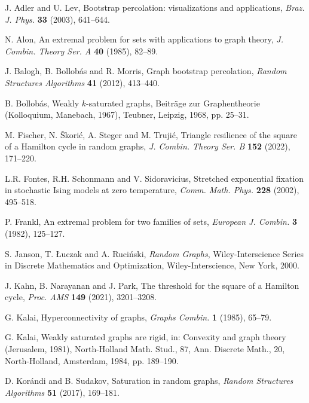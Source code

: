 \documentclass[hidelinks, 11pt]{article}
\theoremstyle{plain}
\theoremstyle{definition}
\begin{document}
\begin{thebibliography}{99}


 {\sc J. Adler} and {\sc U. Lev}, Bootstrap percolation: visualizations and applications, {\sl Braz. J. Phys.} {\bf 33} (2003), 641--644.

 {\sc  N. Alon}, An extremal problem for sets with applications to graph theory, {\sl J. Combin. Theory Ser. A}   {\bf 40} (1985), 82--89.

 {\sc  J. Balogh}, {\sc B. Bollob\'{a}s}  and  {\sc R. Morris}, Graph bootstrap percolation, {\sl Random Structures Algorithms}  {\bf 41} (2012), 413--440.

 {\sc  B. Bollob\'{a}s},   Weakly  $k$-saturated graphs, Beitr\"{a}ge zur Graphentheorie   (Kolloquium, Manebach, 1967), Teubner, Leipzig, 1968, pp. 25--31.

 {\sc M. Fischer}, {\sc N. \v Skori\'{c}}, {\sc A. Steger} and {\sc M. Truji\'{c}},  Triangle resilience of the square of a Hamilton cycle in random graphs,  {\sl J. Combin. Theory Ser. B} {\bf 152} (2022), 171--220.

 {\sc L.R. Fontes}, {\sc R.H. Schonmann} and {\sc V. Sidoravicius}, Stretched exponential fixation in stochastic Ising models at zero temperature, {\sl Comm. Math. Phys.}  {\bf 228} (2002), 495--518.

 {\sc P. Frankl}, An extremal problem for two families of sets,  {\sl European J. Combin.}  {\bf 3} (1982), 125--127.

 {\sc  S. Janson}, {\sc T. \L uczak} and {\sc A. Ruci\'{n}ski},  {\sl Random Graphs}, Wiley-Interscience Series in Discrete Mathematics and Optimization,  Wiley-Interscience, New York, 2000.

 {\sc J. Kahn}, {\sc B. Narayanan} and {\sc J. Park}, The threshold for the square of a Hamilton cycle, {\sl Proc. AMS} {\bf 149} (2021), 3201--3208.

 {\sc  G. Kalai}, Hyperconnectivity of graphs,  {\sl Graphs Combin.}   {\bf 1} (1985), 65--79.

 {\sc  G. Kalai}, Weakly saturated graphs are rigid,  in: Convexity and graph theory (Jerusalem, 1981), North-Holland Math. Stud., 87, Ann. Discrete Math., 20, North-Holland, Amsterdam, 1984, pp.  189--190.

 {\sc D. Kor\'{a}ndi} and {\sc B. Sudakov}, Saturation in random graphs, {\sl Random Structures  Algorithms}   {\bf 51} (2017),  169--181.


\end{thebibliography}
\end{document}
